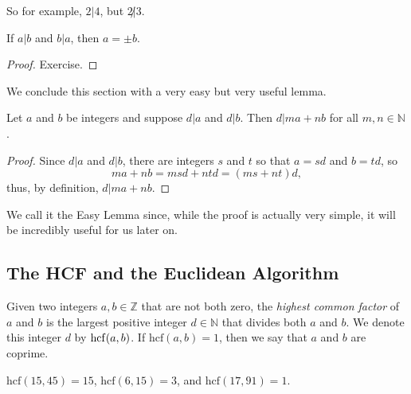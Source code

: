 \documentclass[11pt,dvipsnames]{book}
\def\Z{\mathbb{Z}}
\def\N{{\mathbb{N}}}
\def\hcf{{\rm hcf}}
\numberwithin{equation}{section} %
\numberwithin{figure}{section} %
\numberwithin{table}{section} %
\begin{document}
So for example, $2|4$, but $2\not|3$. 


\begin{lemma}
\label{l:abba}
If $a|b$ and $b|a$, then $a=\pm b$. 
\end{lemma}

\begin{proof}
Exercise.
\end{proof}






We conclude this section with a very easy but very useful lemma. 

\begin{lemma} 
\label{l:easy-lemma}
Let $a$ and $b$ be integers and suppose $d|a$ and $d|b$. Then $d|ma+nb$ for all $m,n\in\mathbb{N}$. 
\end{lemma}

\begin{proof}
Since $d|a$ and $d|b$, there are integers $s$ and $t$ so that $a=sd$ and $b=td$, so 
\[
ma+nb=msd+ntd=(ms+nt)d,\]
thus, by definition, $d|ma+nb$.
\end{proof}

\def\easylemma{\hyperref[l:easy-lemma]{The Easy Lemma}}

We call it the Easy Lemma since, while the proof is actually very simple, it will be incredibly useful for us later on. 



\subsection{The HCF and the Euclidean Algorithm}


\begin{definition}
Given two integers $a,b\in\Z$ that are not both zero, the {\it highest common factor} of $a$ and $b$ is the largest positive integer $d\in\N$ that divides both $a$ and $b$. We denote this integer $d$ by $\hcf(a,b)$. If $\mathrm{hcf}(a,b)=1$, then we say that $a$ and $b$ are
\textcolor[rgb]{1.00,0.00,0.00}{coprime}.
\end{definition}

\begin{example} $\mathrm{hcf}(15,45)=15$, 
$\mathrm{hcf}(6,15)=3$, and $\mathrm{hcf}(17,91)=1$.
\end{example}
\end{document}
